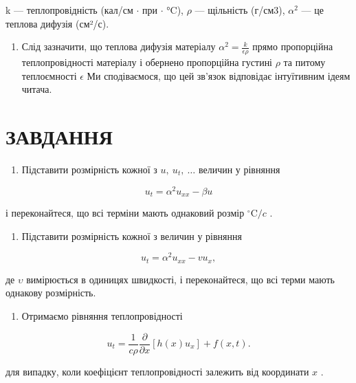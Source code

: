 \documentclass[
  ukrainian,
]{article}
\providecommand{\tightlist}{%
  \setlength{\itemsep}{0pt}\setlength{\parskip}{0pt}}
\begin{document}
k --- теплопровідність (кал/см \(\cdot\) при \(\cdot\) °C), \(\rho\) ---
щільність (г/см3), \(\alpha^2\) --- це теплова дифузія (см²/с).

\begin{enumerate}
\def\labelenumi{\arabic{enumi}.}
\setcounter{enumi}{3}
\tightlist
\item
  Слід зазначити, що теплова дифузія матеріалу
  \(\alpha^2 = \frac{k}{\epsilon \rho}\) прямо пропорційна
  теплопровідності матеріалу і обернено пропорційна густині \(\rho\) та
  питому теплоємності \(\epsilon\) Ми сподіваємося, що цей зв'язок
  відповідає інтуїтивним ідеям читача.
\end{enumerate}

\section{ЗАВДАННЯ}\label{ux437ux430ux432ux434ux430ux43dux43dux44f-3}

\begin{enumerate}
\def\labelenumi{\arabic{enumi}.}
\tightlist
\item
  Підставити розмірність кожної з \(u,\ u_t,\ \dots\) величин у рівняння
\end{enumerate}

\[
u_t = \alpha^2 u_{xx} - \beta u
\]

і переконайтеся, що всі терміни мають однаковий розмір
\({}^{\circ}\mathrm{C}/c\) .

\begin{enumerate}
\def\labelenumi{\arabic{enumi}.}
\setcounter{enumi}{1}
\tightlist
\item
  Підставити розмірність кожної з величин у рівняння
\end{enumerate}

\[
u_t = \alpha^2 u_{xx} - v u_x,
\]

де \(\upsilon\) вимірюється в одиницях швидкості, і переконайтеся, що
всі терми мають однакову розмірність.

\begin{enumerate}
\def\labelenumi{\arabic{enumi}.}
\setcounter{enumi}{2}
\tightlist
\item
  Отримаємо рівняння теплопровідності
\end{enumerate}

\[
u_t = \frac{1}{c\rho}\frac{\partial}{\partial x}\left[h(x)u_x\right] + f(x,t).
\]

для випадку, коли коефіцієнт теплопровідності залежить від координати
\(x\) .
\end{document}
